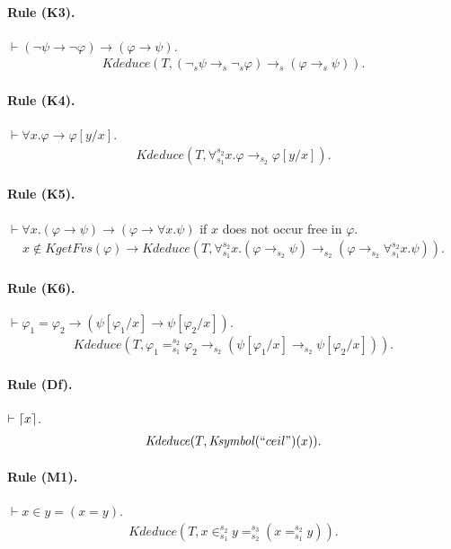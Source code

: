 \documentclass[UTF8]{article}
\theoremstyle{plain}
\theoremstyle{definition}
\theoremstyle{remark}
\DeclarePairedDelimiter{\ceil}{\lceil}{\rceil}
\newcommand{\Ksymbol}{\mathit{Ksymbol}}
\newcommand{\kimplies}{\to}
\newcommand{\knot}{\neg}
\newcommand{\kforall}{\forall}
\newcommand{\kequals}{=}
\newcommand{\kin}{\in}
\newcommand{\KgetFvs}{\mathit{KgetFvs}}
\newcommand{\Kdeduce}{\mathit{Kdeduce}}
\begin{document}
\paragraph{Rule (K3).}
$\vdash (\neg \psi \to \neg \varphi) \to (\varphi \to \psi)$.
\begin{align*}
\Kdeduce(T, (\knot_s \psi \kimplies_s \knot_s \varphi) \kimplies_s (\varphi 
\kimplies_s \psi)).
\end{align*}

\paragraph{Rule (K4).}
$\vdash \forall x . \varphi \to \varphi[y/x]$.
\begin{align*}
\Kdeduce(T, \kforall_{s_1}^{s_2}  x . \varphi \kimplies_{s_2} \varphi[y/x]).
\end{align*}

\paragraph{Rule (K5).}
$\vdash \forall x . (\varphi \to \psi) \to (\varphi \to \forall x . \psi)$ if $x$ does not occur free in $\varphi$. 
\begin{align*}
x \not\in \KgetFvs(\varphi)
\to \Kdeduce(T, \kforall_{s_1}^{s_2} x . (\varphi \kimplies_{s_2} \psi) 
\kimplies_{s_2} (\varphi \kimplies_{s_2} \kforall_{s_1}^{s_2} x . \psi)).
\end{align*}

\paragraph{Rule (K6).}
$\vdash \varphi_1 = \varphi_2 \to (\psi[\varphi_1/x] \to \psi[\varphi_2/x])$.
\begin{align*}
\Kdeduce(T, \varphi_1 \kequals_{s_1}^{s_2} \varphi_2 \kimplies_{s_2} 
(\psi[\varphi_1/x] \kimplies_{s_2} \psi[\varphi_2/x])).
\end{align*}

\paragraph{Rule (Df).}
$\vdash \ceil{x}$.
\begin{align*}
\Kdeduce(T, \Ksymbol(``ceil")(x)).
\end{align*}

\paragraph{Rule (M1).}
$\vdash x \in y = (x = y)$.
\begin{align*}
\Kdeduce(T, x \kin_{s_1}^{s_2} y \kequals_{s_2}^{s_3} (x \kequals_{s_1}^{s_2} 
y)).
\end{align*}
\end{document}
